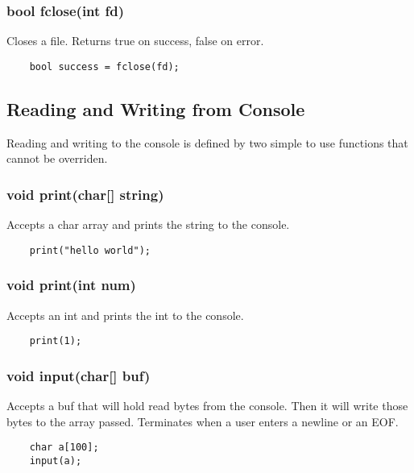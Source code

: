 \begin{homeworkProblem}
	\subsubsection{bool fclose(int fd)}
	Closes a file. Returns true on success, false on error.
	\begin{verbatim} 
	bool success = fclose(fd);
	\end{verbatim}
	
	\subsection{Reading and Writing from Console}
	
	Reading and writing to the console is defined by two simple to use functions that cannot be overriden.
	
	\subsubsection{void print(char[] string)}
	Accepts a char array and prints the string to the console.
	\begin{verbatim} 
	print("hello world");
	\end{verbatim}
	
	\subsubsection{void print(int num)}
	Accepts an int and prints the int to the console.
	\begin{verbatim} 
	print(1);
	\end{verbatim}
	
	\subsubsection{void input(char[] buf)}
	Accepts a buf that will hold read bytes from the console. Then it will write those bytes to the array passed. Terminates when a user enters a newline or an EOF. 
	\begin{verbatim} 
	char a[100];
	input(a);
	\end{verbatim}
	
\end{homeworkProblem}
